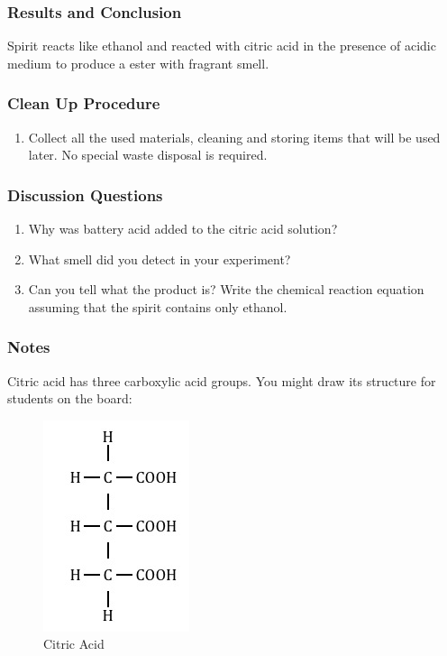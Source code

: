 \subsubsection*{Results and Conclusion}
Spirit reacts like ethanol and reacted with citric acid in the presence of acidic medium to produce a ester with fragrant smell.

\subsubsection*{Clean Up Procedure}
\begin{enumerate}
\item{Collect all the used materials, cleaning and storing items that will be used later. No special waste disposal is required.}
\end{enumerate}

\subsubsection*{Discussion Questions}
\begin{enumerate}
\item{Why was battery acid added to the citric acid solution?}
\item{What smell did you detect in your experiment?}
\item{Can you tell what the product is? Write the chemical reaction equation assuming that the spirit contains only ethanol.}
\end{enumerate}

\subsubsection*{Notes}
Citric acid has three carboxylic acid groups. You might draw its structure for students on the board: 
\begin{center}
\begin{figure}[h]
\begin{center}\includegraphics[scale=0.5]{img/citric-acid.png}\end{center}
\caption{Citric Acid}
\end{figure}
\end{center}


